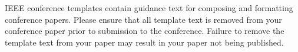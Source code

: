 \documentclass[conference]{IEEEtran}
\begin{document}
\vspace{12pt}
\color{red}
IEEE conference templates contain guidance text for composing and formatting conference papers. Please ensure that all template text is removed from your conference paper prior to submission to the conference. Failure to remove the template text from your paper may result in your paper not being published.
\end{document}

